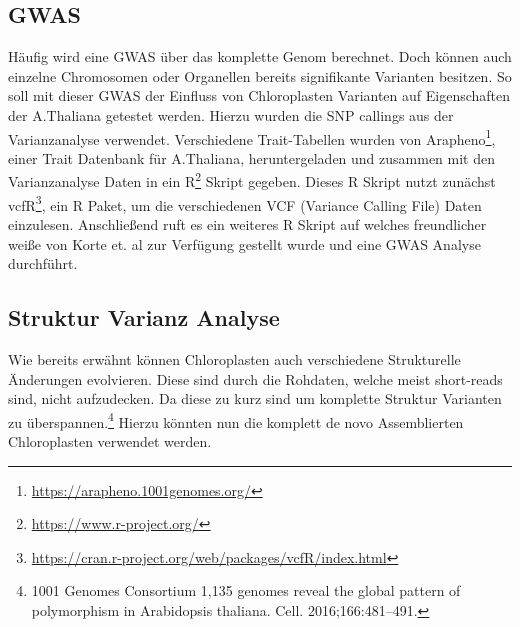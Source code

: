 \documentclass{scrartcl}
\begin{document}
\subsection{GWAS}
\label{sec-3-4}
Häufig wird eine GWAS über das komplette Genom berechnet. Doch können auch einzelne Chromosomen oder Organellen bereits signifikante Varianten besitzen. 
So soll mit dieser GWAS der Einfluss von Chloroplasten Varianten auf Eigenschaften der A.Thaliana getestet werden. Hierzu wurden die SNP callings aus der Varianzanalyse verwendet.
Verschiedene Trait-Tabellen wurden von Arapheno\footnote{\url{https://arapheno.1001genomes.org/}}, einer Trait Datenbank für A.Thaliana, heruntergeladen und zusammen mit den Varianzanalyse Daten in ein R\footnote{\url{https://www.r-project.org/}} Skript gegeben.
Dieses R Skript nutzt zunächst vcfR\footnote{\url{https://cran.r-project.org/web/packages/vcfR/index.html}}, ein R Paket, um die verschiedenen VCF (Variance Calling File) Daten einzulesen. Anschließend ruft es ein weiteres R Skript auf welches
freundlicher weiße von Korte et. al\footnotemark[34]{} zur Verfügung gestellt wurde und eine GWAS Analyse durchführt.

\subsection{Struktur Varianz Analyse}
\label{sec-3-5}
Wie bereits erwähnt können Chloroplasten auch verschiedene Strukturelle Änderungen evolvieren. Diese sind durch die Rohdaten, welche meist short-reads sind, nicht aufzudecken.
Da diese zu kurz sind um komplette Struktur Varianten zu überspannen.\footnote{1001 Genomes Consortium 1,135 genomes reveal the global pattern of polymorphism in Arabidopsis thaliana. Cell. 2016;166:481–491.}
Hierzu könnten nun die komplett de novo Assemblierten Chloroplasten verwendet werden. 
\end{document}
